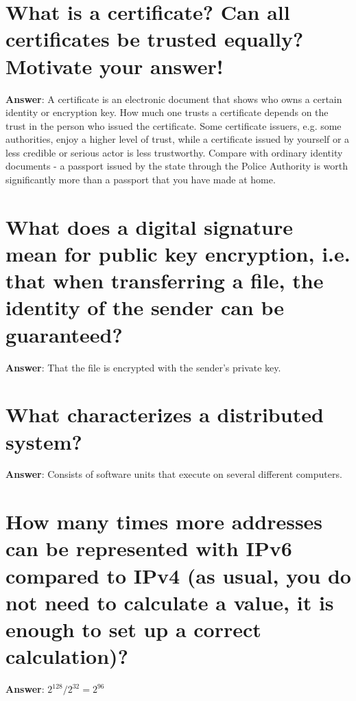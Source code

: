 \documentclass[a4paper,11pt,oneside]{book}
\begin{document}
\begin{sloppypar}
\section{What is a certificate? Can all certificates be trusted equally? Motivate your answer!}

\label{q:155:sa:en:True}

\textbf{Answer}: A certificate is an electronic document that shows who owns a certain identity or encryption key. How much one trusts a certificate depends on the trust in the person who issued the certificate. Some certificate issuers, e.g. some authorities, enjoy a higher level of trust, while a certificate issued by yourself or a less credible or serious actor is less trustworthy. Compare with ordinary identity documents - a passport issued by the state through the Police Authority is worth significantly more than a passport that you have made at home.



\section{What does a digital signature mean for public key encryption, i.e. that when transferring a file, the identity of the sender can be guaranteed?}

\label{q:156:sa:en:True}

\textbf{Answer}: That the file is encrypted with the sender's private key.



\section{What characterizes a distributed system?}

\label{q:157:sa:en:True}

\textbf{Answer}: Consists of software units that execute on several different computers.



\section{How many times more addresses can be represented with IPv6 compared to IPv4 (as usual, you do not need to calculate a value, it is enough to set up a correct calculation)?}

\label{q:158:sa:en:True}

\textbf{Answer}: $2^128 / 2^32 = 2^96$




\end{sloppypar}
\end{document}
